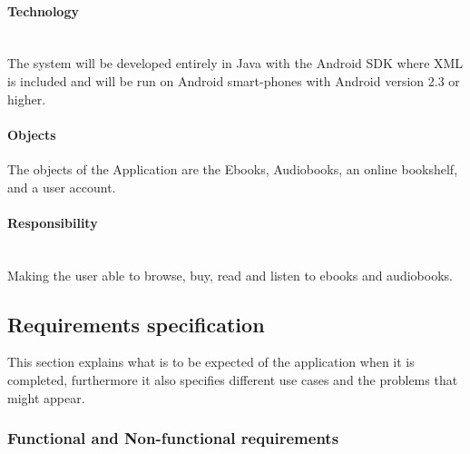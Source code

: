 \documentclass[12pt]{article}
\begin{document}
\paragraph{Technology}$ $\\
The system will be developed entirely in Java with the Android SDK where XML is included and will be run on Android smart-phones with Android version 2.3 or higher.

\paragraph{Objects}
The objects of the Application are the Ebooks, Audiobooks, an online bookshelf, and a user account.

\paragraph{Responsibility}$ $\\
Making the user able to browse, buy, read and listen to ebooks and audiobooks.

\subsection{Requirements specification}
This section explains what is to be expected of the application when it is completed, furthermore it also specifies different use cases and the problems that might appear.
\subsubsection{Functional and Non-functional requirements}
\end{document}
